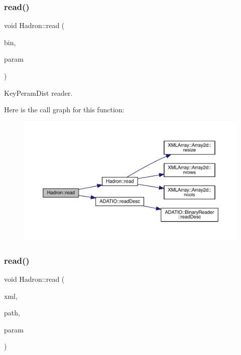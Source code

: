 \subsubsection{\texorpdfstring{read()}{read()}\hspace{0.1cm}{\footnotesize\ttfamily [29/94]}}
{\footnotesize\ttfamily void Hadron\+::read (\begin{DoxyParamCaption}\item[{\mbox{\hyperlink{classADATIO_1_1BinaryReader}{Binary\+Reader}} \&}]{bin,  }\item[{\mbox{\hyperlink{structHadron_1_1KeyPeramDist__t}{Key\+Peram\+Dist\+\_\+t}} \&}]{param }\end{DoxyParamCaption})}



Key\+Peram\+Dist reader. 

Here is the call graph for this function\+:
\nopagebreak
\begin{figure}[H]
\begin{center}
\leavevmode
\includegraphics[width=350pt]{d1/daf/namespaceHadron_ac70286e9fd2f4a9ddf81f9235d1812e8_cgraph}
\end{center}
\end{figure}
\mbox{\label{namespaceHadron_a9c6649bbe7b32cbc5fcbf8ebbf17d987}} 
\subsubsection{\texorpdfstring{read()}{read()}\hspace{0.1cm}{\footnotesize\ttfamily [30/94]}}
{\footnotesize\ttfamily void Hadron\+::read (\begin{DoxyParamCaption}\item[{\mbox{\hyperlink{classADATXML_1_1XMLReader}{X\+M\+L\+Reader}} \&}]{xml,  }\item[{const std\+::string \&}]{path,  }\item[{\mbox{\hyperlink{structHadron_1_1KeyGenPropElementalOperator__t}{Key\+Gen\+Prop\+Elemental\+Operator\+\_\+t}} \&}]{param }\end{DoxyParamCaption})}



